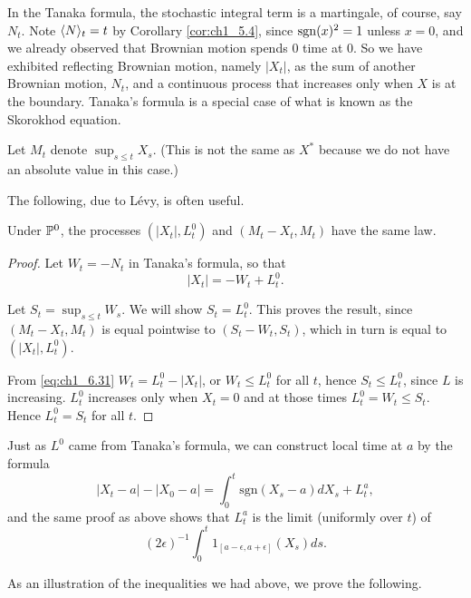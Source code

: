 In the Tanaka formula, the stochastic integral term is a martingale, of course, say $N_t$. Note $\lrang{N}_t = t$ by Corollary \ref{cor:ch1_5.4}, since $\sgn(x)^2 = 1$ unless $x = 0$, and we already observed that Brownian motion spends $0$ time at $0$. So we have exhibited reflecting Brownian motion, namely $|X_t|$, as the sum of another Brownian motion, $N_t$, and a continuous process that increases only when $X$ is at the boundary. Tanaka's formula is a special case of what is known as the Skorokhod equation.


Let $M_t$ denote $\sup_{s\leq t} X_s$. (This is not the same as $X^*$ because we do not have an absolute value in this case.)

The following, due to L\'evy, is often useful.

\begin{theorem}\label{thm:ch1_6.15}
Under $\P^0$, the processes $(|X_t|, L_t^0)$ and $(M_t - X_t, M_t)$ have the same law.
\end{theorem}

\begin{proof}
Let $W_t = -N_t$ in Tanaka's formula, so that
\begin{equation}\label{eq:ch1_6.31}
    |X_t| = -W_t + L_t^0.
\end{equation}

Let $S_t = \sup_{s\leq t} W_s$. We will show $S_t = L_t^0$. This proves the result, since $(M_t - X_t, M_t)$ is equal pointwise to $(S_t - W_t, S_t)$, which in turn is equal to $(|X_t|, L_t^0)$.

From \eqref{eq:ch1_6.31} $W_t=L_t^0-|X_t|$, or $W_t \leq L_t^0$ for all $t$, hence $S_t \leq L_t^0$, since $L$ is increasing. $L_t^0$ increases only when $X_t = 0$ and at those times $L_t^0 = W_t \leq S_t$. Hence $L_t^0 = S_t$ for all $t$.
\end{proof}

Just as $L^0$ came from Tanaka's formula, we can construct local time at $a$ by the formula
\begin{equation}\label{eq:ch1_6.32}
    |X_t - a| - |X_0 - a| = \int_0^t \text{sgn}(X_s - a)dX_s + L_t^a,
\end{equation}
and the same proof as above shows that $L_t^a$ is the limit (uniformly over $t$) of
\[
    (2\epsilon)^{-1} \int_0^t 1_{[a-\epsilon,a+\epsilon]}(X_s)ds.
\]

As an illustration of the inequalities we had above, we prove the following.

